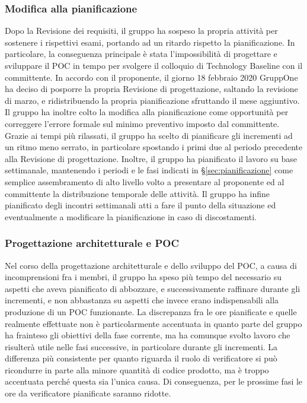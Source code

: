 \documentclass[../piano-di-progetto.tex]{subfiles}
\begin{document}
\subsubsection{Modifica alla pianificazione}%
\label{subs:modifica_alla_pianificazione}

Dopo la Revisione dei requisiti, il gruppo ha sospeso la propria attività per sostenere i rispettivi esami, portando ad un ritardo rispetto la pianificazione.
In particolare, la conseguenza principale è stata l'impossibilità di progettare e sviluppare il POC in tempo per svolgere il colloquio di Technology Baseline con il committente.
In accordo con il proponente, il giorno 18 febbraio 2020 GruppOne ha deciso di posporre la propria Revisione di progettazione, saltando la revisione di marzo, e ridistribuendo la propria pianificazione sfruttando il mese aggiuntivo.
Il gruppo ha inoltre colto la modifica alla pianificazione come opportunità per correggere l'errore formale sul minimo preventivo imposto dal committente.
Grazie ai tempi più rilassati, il gruppo ha scelto di pianificare gli incrementi ad un ritmo meno serrato, in particolare spostando i primi due al periodo precedente alla Revisione di progettazione.
Inoltre, il gruppo ha pianificato il lavoro su base settimanale, mantenendo i periodi e le fasi indicati in §\ref{sec:pianificazione} come semplice assembramento di alto livello volto a presentare al proponente ed al committente la distribuzione temporale delle attività.
Il gruppo ha infine pianificato degli incontri settimanali atti a fare il punto della situazione ed eventualmente a modificare la pianificazione in caso di discostamenti.

\subsubsection{Progettazione architetturale e POC}%
\label{subs:progettazione_architetturale_e_poc}

Nel corso della progettazione architetturale e dello sviluppo del POC, a causa di incomprensioni fra i membri, il gruppo ha speso più tempo del necessario su aspetti che aveva pianificato di abbozzare, e successivamente raffinare durante gli incrementi, e non abbastanza su aspetti che invece erano indispensabili alla produzione di un POC funzionante.
La discrepanza fra le ore pianificate e quelle realmente effettuate non è particolarmente accentuata in quanto parte del gruppo ha frainteso gli obiettivi della fase corrente, ma ha comunque svolto lavoro che risulterà utile nelle fasi successive, in particolare durante gli incrementi.
La differenza più consistente per quanto riguarda il ruolo di verificatore si può ricondurre in parte alla minore quantità di codice prodotto, ma è troppo accentuata perché questa sia l'unica causa.
Di conseguenza, per le prossime fasi le ore da verificatore pianificate saranno ridotte.
\end{document}

